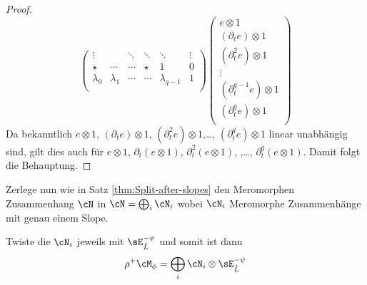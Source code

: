 \begin{proof}
\[\begin{pmatrix}
\vdots    &           & \ddots & \ddots & \ddots        & \vdots\\
\star     & \cdots    & \cdots & \star  & 1             & 0\\
\lambda_0 & \lambda_1 & \cdots & \cdots & \lambda_{q-1} & 1\\
\end{pmatrix}
\begin{pmatrix}
e\otimes 1\\
(\partial_t e)\otimes 1\\
(\partial_t^{2}e)\otimes 1\\
\vdots\\
(\partial_t^{q-1}e)\otimes 1\\
(\partial_t^{q}e)\otimes 1\\
\end{pmatrix}
\]
Da bekanntlich $e\otimes1$, $(\partial_t e)\otimes 1$, $(\partial_t^{2}e)\otimes
1$,\dots, $(\partial_t^{q}e)\otimes 1$ linear unabhängig sind, gilt dies auch
für $e\otimes 1$, $\partial_t(e\otimes 1)$, $\partial_t^2(e\otimes 1)$, ,\dots,
$\partial_t^{q}(e\otimes 1)$. Damit folgt die Behauptung.
\end{proof}
\begin{comment}
\begin{lem}
\cite[Seite 44]{DiplHedwig}
Wenn $\rho^+\cM_\phi=\cD_{\hat K}/\cD_{\hat
K}\cdot(\rho^*P_{\phi}(x,\partial_x))$ gilt, so ist
\begin{align*}
\cN\bydef\rho^+\cM_\phi\otimes\sE_{\hat K}^\psi
  &=\cD_{\hat K}/\cD_{\hat
    K}\cdot(\rho^*P_{\phi}(x,\partial_x+\frac{\beta}{x^{\lambda+1}}))\\
  &=\cD_{\hat K}/\cD_{\hat
    K}\cdot(\rho^*P_{\phi}(x,\partial_x+\frac{\beta}{x^{\lambda+1}}))
\end{align*}
\end{lem}
\end{comment}
Zerlege nun wie in  Satz \ref{thm:Split-after-slopes} den Meromorphen
Zusammenhang $\cN$ in $\cN=\bigoplus_i\cN_i$ wobei $\cN_i$ Meromorphe
Zusammenhänge mit genau einem Slope.

\begin{comment}
Wende auf die $\cN_i$ jeweils die Induktion an und erhalte zu jedem (nach
eventuellem pull-back) eine Zerlegung in reguläre Meromorphe Zusammenhänge.
Nach dem diese mittels $\sE^{-\psi}_{\hat L}$ zurückgetwistet wurden, sind
diese immer noch regulär, aber die direkte Summe davon ist isomorph zu
$\rho^+\cM_{\phi}$.
\end{comment}
Twiste die $\cN_i$ jeweils mit $\sE^{-\psi}_{\hat L}$ und somit ist dann
\[
\rho^+\cM_{\phi}=\bigoplus_i\cN_i\otimes\sE^{-\psi}_{\hat L}
\]

